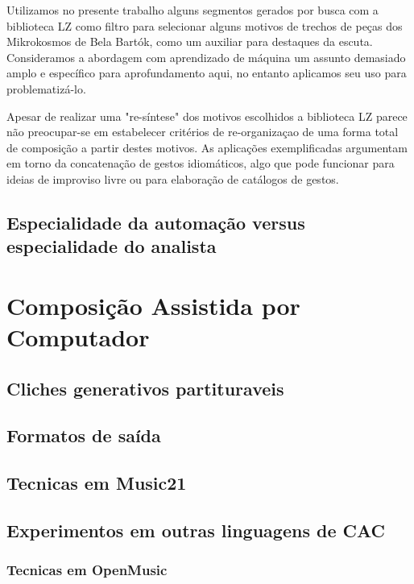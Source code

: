 \documentclass[
	12pt,				%
	openright,			%
	twoside,			%
	a4paper,			%
	english,			%
	french,				%
	spanish,			%
	brazil				%
	]{abntex2}
\begin{document}
Utilizamos no presente trabalho alguns segmentos gerados por busca com a biblioteca LZ como filtro para selecionar alguns motivos de trechos de peças dos Mikrokosmos de Bela Bartók, como um auxiliar para destaques da escuta. Consideramos a abordagem com aprendizado de máquina um assunto demasiado amplo e específico para aprofundamento aqui, no entanto aplicamos seu uso para problematizá-lo.

Apesar de realizar uma "re-síntese" dos motivos escolhidos a biblioteca LZ parece não preocupar-se em estabelecer critérios de re-organizaçao de uma forma total de composição a partir destes motivos. As aplicações exemplificadas argumentam em torno da concatenação de gestos idiomáticos, algo que pode funcionar para ideias de improviso livre ou para elaboração de catálogos de gestos. 




\section{Especialidade da automação versus especialidade do analista}



\chapter{Composição Assistida por Computador}

\section{Cliches generativos partituraveis}



\section{Formatos de saída}

\section{Tecnicas em Music21}

\section{Experimentos em outras linguagens de CAC}

\subsection{Tecnicas em OpenMusic}
\end{document}

